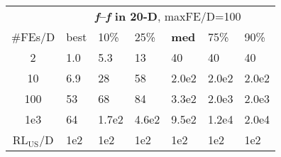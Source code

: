 \begin{tabular}{c|llllll}
 & \multicolumn{6}{|c}{\textbf{\textit{f}\raisebox{-0.35ex}{1}--\textit{f}\raisebox{-0.35ex}{24} in 20-D}, maxFE/D=100}\\
\#FEs/D & best & 10\% & 25\% & \textbf{med} & 75\% & 90\%\\
2 & \hspace*{1ex}1.0 & \hspace*{1ex}5.3 & 13 & 40 & 40 & 40\\
10 & \hspace*{1ex}6.9 & 28 & 58 & 2.0e2 & 2.0e2 & 2.0e2\\
100 & 53 & 68 & 84 & 3.3e2 & 2.0e3 & 2.0e3\\
1e3 & 64 & 1.7e2 & 4.6e2 & 9.5e2 & 1.2e4 & 2.0e4\\
$\text{RL}_{\text{US}}$/D & 1e2 & 1e2 & 1e2 & 1e2 & 1e2 & 1e2
\end{tabular}
